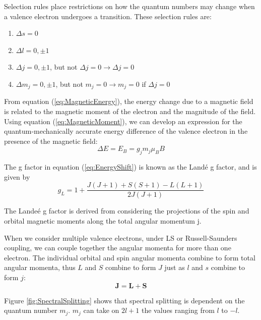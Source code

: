 \documentclass[twocolumn]{article}
\begin{document}
		
		Selection rules place restrictions on how the quantum numbers may change when a valence electron undergoes a transition.
		These selection rules are:
		\begin{enumerate}
			\item $\Delta s = 0$
			\item $\Delta l = 0, \pm1$
			\item $\Delta j = 0, \pm1$, but not $\Delta j = 0 \rightarrow \Delta j = 0$
			\item $\Delta m_j = 0, \pm1$, but not $m_j=0\rightarrow m_j=0$ if $\Delta j = 0$
		\end{enumerate}
		
		From equation (\ref{eq:MagneticEnergy}), the energy change due to a magnetic field is related to the magnetic moment of the electron and the magnitude of the field.
		Using equation (\ref{eq:MagneticMoment}), we can develop an expression for the quantum-mechanically accurate energy difference of the valence electron in the presence of the magnetic field:
		\begin{equation}
			\Delta E = E_B = g_jm_j\mu_BB
			\label{eq:EnergyShift}
		\end{equation}
		
		The g factor in equation (\ref{eq:EnergyShift}) is known as the Land\'{e} g factor, and is given by
		\begin{equation}
		g_L = 1 + \frac{J(J+1) + S(S+1) - L(L+1)}{2J(J+1)}
		\label{eq:LandeGFactor}
		\end{equation}
		
		The Lande\'{e} g factor is derived from considering the projections of the spin and orbital magnetic moments along the total angular momentum j.
		\cite{stoltenberg_zeeman_2007}
		
		When we consider multiple valence electrons, under LS or Russell-Saunders coupling, we can couple together the angular momenta for more than one electron. 
		The individual orbital and spin angular momenta combine to form total angular momenta, thus $L$ and $S$ combine to form $J$ just as $l$ and $s$ combine to form $j$:
		\begin{equation}
			\mathbf{J} = \mathbf{L} + \mathbf{S}
		\end{equation}
		
		Figure \ref{fig:SpectralSplitting} shows that spectral splitting is dependent on the quantum number $m_j$.
		$m_j$ can take on $2l+1$ the values ranging from $l$ to $-l$.
		
\end{document}
